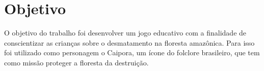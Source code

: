 \section{Objetivo}
\label{cap:objetivo}

O objetivo do trabalho foi desenvolver um jogo educativo com a finalidade de conscientizar as crianças sobre o desmatamento na floresta amazônica. Para isso foi utilizado como personagem o Caipora, um ícone do folclore brasileiro, que tem como missão proteger a floresta da destruição.